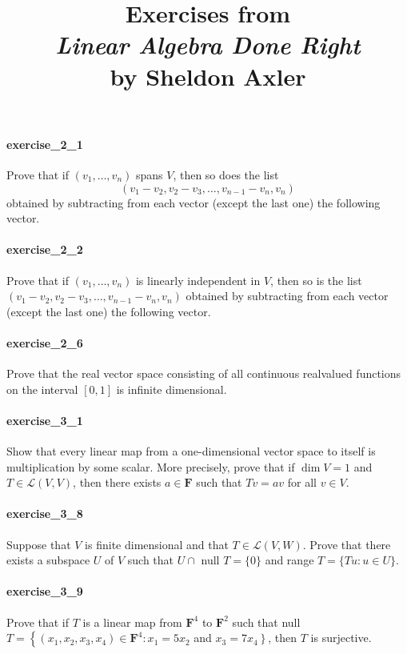 \documentclass{article}
\title{\textbf{
Exercises from \\
\textit{Linear Algebra Done Right} \\
by Sheldon Axler
}}
\date{}
\begin{document}
\maketitle

\paragraph{exercise\_2\_1} Prove that if $\left(v_{1}, \ldots, v_{n}\right)$ spans $V$, then so does the list \[\left(v_{1}-v_{2}, v_{2}-v_{3}, \ldots, v_{n-1}-v_{n}, v_{n}\right)\] obtained by subtracting from each vector (except the last one) the following vector.

\paragraph{exercise\_2\_2} Prove that if $\left(v_{1}, \ldots, v_{n}\right)$ is linearly independent in $V$, then so is the list $\left(v_{1}-v_{2}, v_{2}-v_{3}, \ldots, v_{n-1}-v_{n}, v_{n}\right)$ obtained by subtracting from each vector (except the last one) the following vector.

\paragraph{exercise\_2\_6} Prove that the real vector space consisting of all continuous realvalued functions on the interval $[0,1]$ is infinite dimensional.

\paragraph{exercise\_3\_1} Show that every linear map from a one-dimensional vector space to itself is multiplication by some scalar. More precisely, prove that if $\operatorname{dim} V=1$ and $T \in \mathcal{L}(V, V)$, then there exists $a \in \mathbf{F}$ such that $T v=a v$ for all $v \in V$.

\paragraph{exercise\_3\_8} Suppose that $V$ is finite dimensional and that $T \in \mathcal{L}(V, W)$. Prove that there exists a subspace $U$ of $V$ such that $U \cap$ null $T=\{0\}$ and range $T=\{T u: u \in U\}$.

\paragraph{exercise\_3\_9} Prove that if $T$ is a linear map from $\mathbf{F}^{4}$ to $\mathbf{F}^{2}$ such that null $T=\left\{\left(x_{1}, x_{2}, x_{3}, x_{4}\right) \in \mathbf{F}^{4}: x_{1}=5 x_{2}\right.$ and $\left.x_{3}=7 x_{4}\right\}$, then $T$ is surjective.
\end{document}
